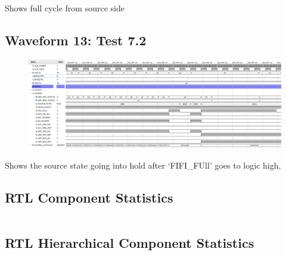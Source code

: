 \documentclass[11pt]{report}
\begin{document}
Shows full cycle from source side\\

\subsection*{Waveform 13: Test 7.2 }
\begin{figure}[H]
       \includegraphics[width=\columnwidth]{Assets/Test7_2.png}
\end{figure}

Shows the source state going into hold after `FIFI\_FUll' goes to logic high,

\subsection*{RTL Component Statistics}
\inputminted[firstline=170,lastline=191]{text}{../../../DE_Project_T2/DE_Project_T2.runs/synth_1/TOP_LEVEL.vds}

\subsection*{RTL Hierarchical Component Statistics}
\inputminted[firstline=198,lastline=266]{text}{../../../DE_Project_T2/DE_Project_T2.runs/synth_1/TOP_LEVEL.vds}
\end{document}
